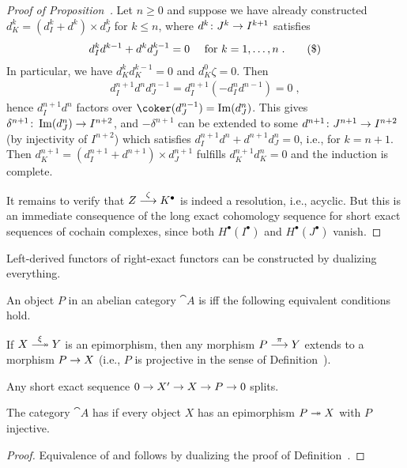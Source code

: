 \documentclass[a4paper,parskip=half,numbers=enddot, DIV=12]{scrreprt}
\renewcommand{\geq}{\geqslant}
\renewcommand{\leq}{\leqslant}
\begin{document}
\begin{proof}[Proof of Proposition~]
	 Let $n\geq 0$ and suppose we have already constructed $d_{K }^k=(d_{I }^k+d^k)\times d_{J }^k$ for $k\leq n$, where $d^k\colon J^k\morphism I^{k+1}$ satisfies
	 \begin{align}\lbl{eq:Horseshoe3}
	 	 d_{I }^kd^{k-1}+d^kd_{J }^{k-1}=0\quad\text{ for }k=1,\ldots,n\;.\tag{\$}
	 \end{align}
	  In particular, we have $d_{K }^kd_{K }^{k-1}=0$ and $d_{K }^0\zeta=0$. Then
	 \begin{align*}
	 	d_{I }^{n+1}d^nd_{J }^{n-1}=d_{I }^{n+1}\left(-d_{I }^nd^{n-1}\right)=0\;,
	 \end{align*}
	 hence $d_{I }^{n+1}d^n$ factors over $\coker(d_{J }^{n-1})=\Im(d_{J }^n)$. This gives $\delta^{n+1}\colon \Im(d_{J }^n)\morphism I^{n+2}$, and $-\delta^{n+1}$ can be extended to some $d^{n+1}\colon J^{n+1}\morphism I^{n+2}$ (by injectivity of $I^{n+2}$) which satisfies $d_{I }^{n+1}d^{n}+d^{n+1}d_{J }^n=0$, i.e.,  for $k=n+1$. Then $d_{K }^{n+1}=(d_{I }^{n+1}+d^{n+1})\times d_{J }^{n+1}$ fulfills $d_{K }^{n+1}d_{K }^n=0$ and the induction is complete.
	
	 It remains to verify that $Z\morphism[\zeta]K^\bullet $ is indeed a resolution, i.e., acyclic. But this is an immediate consequence of the long exact cohomology sequence for short exact sequences of cochain complexes, since both $H^\bullet (I^\bullet )$ and $H^\bullet (J^\bullet )$ vanish.
\end{proof}
Left-derived functors of right-exact functors can be constructed by dualizing everything.
\begin{defi}
	An object $P$ in an abelian category ${\cat A}$ is  iff the following equivalent conditions hold.
	\begin{alphanumerate}
		\item If $X\epimorphism[\xi] Y$ is an epimorphism, then any morphism $P\morphism[\pi] Y$ extends to a morphism $P\morphism X$ (i.e., $P$ is projective in the sense of Definition~).
		\item Any short exact sequence $0\morphism X'\morphism X\morphism P\morphism 0$ splits.
	\end{alphanumerate}
	The category ${\cat A}$ has  if every object $X$ has an epimorphism $P\epimorphism X$ with $P$ injective.
\end{defi}
\begin{proof}
	Equivalence of  and  follows by dualizing the proof of Definition~.
\end{proof}
\end{document}

